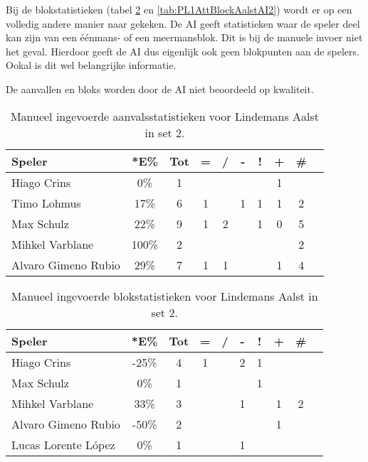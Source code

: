 Bij de blokstatistieken (tabel \ref{tab:PL1BlockAalstMan2} en \ref{tab:PL1AttBlockAalstAI2}) wordt er op een volledig andere manier naar gekeken. De AI geeft statistieken waar de speler deel kan zijn van een éénmans- of een meermansblok. Dit is bij de manuele invoer niet het geval. Hierdoor geeft de AI dus eigenlijk ook geen blokpunten aan de spelers. Ookal is dit wel belangrijke informatie.

De aanvallen en bloks worden door de AI niet beoordeeld op kwaliteit.

\begin{table}[ht!]
  \centering
  \scriptsize
    \begin{tabular}{|l|c|c|c|c|c|c|c|c|c|}
      \hline
      \textbf{Speler} & *E\% & Tot & = & / & - & ! & + & \# \\ \hline
      Hiago Crins  & 0\% & 1 &  &  &  &  & 1 &  \\ 
      Timo Lohmus  & 17\% & 6 & 1 &  & 1 & 1 & 1 & 2 \\ 
      Max Schulz  & 22\% & 9 & 1 & 2 &  & 1 & 0 & 5\\
      Mihkel Varblane  & 100\% & 2 &  &  &  &  &  & 2 \\ 
      Alvaro Gimeno Rubio & 29\% & 7 & 1 & 1 &  &  & 1 & 4 \\ \hline 
  \end{tabular}
\caption[Manueel ingevoerde aanvalsstatistieken voor Lindemans Aalst in set 2]{\label{tab:PL1AttAalstMan2}Manueel ingevoerde aanvalsstatistieken voor Lindemans Aalst in set 2.}
\end{table}

\begin{table}[ht!]
  \centering
  \scriptsize
    \begin{tabular}{|l|c|c|c|c|c|c|c|c|c|}
      \hline
      \textbf{Speler} & *E\% & Tot & = & / & - & ! & + & \# \\ \hline
      Hiago Crins & -25\% & 4 & 1 &  & 2 & 1 &  &  \\ 
      Max Schulz & 0\% & 1 &  &  &  & 1 &  & \\
      Mihkel Varblane & 33\% & 3 &  &  & 1 &  & 1 & 2 \\
      Alvaro Gimeno Rubio & -50\% & 2 &  & &  &  & 1 &  \\
      Lucas Lorente López & 0\% & 1 &  &  & 1 &  &  &  \\ \hline
  \end{tabular}
\caption[Manueel ingevoerde blokstatistieken voor Lindemans Aalst in set 2]{\label{tab:PL1BlockAalstMan2}Manueel ingevoerde blokstatistieken voor Lindemans Aalst in set 2.}
\end{table}


